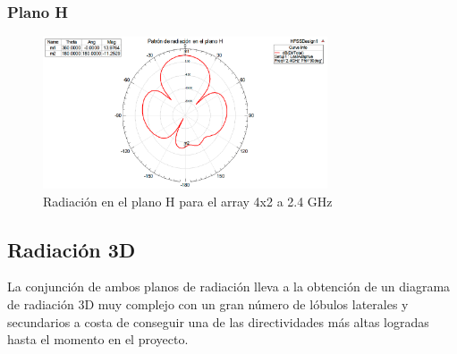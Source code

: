 \subsubsection{Plano H}
\begin{figure}[H]
    \centering
        \includegraphics[width=0.75\textwidth]{archivos/analisis/4x21/5}
        \caption{Radiación en el plano H para el array 4x2 a 2.4 GHz}
        \label{fig:H4x21}
\end{figure}

\subsection{Radiación 3D}
\par La conjunción de ambos planos de radiación lleva a la obtención de un diagrama de radiación 3D muy complejo con un gran número de lóbulos laterales y secundarios a costa de conseguir una de las directividades más altas logradas hasta el momento en el proyecto.

